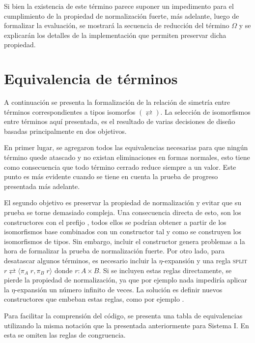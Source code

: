 Si bien la existencia de este término parece suponer un impedimento para el cumplimiento de la propiedad de normalización fuerte, más adelante, luego de formalizar la evaluación, se mostrará la secuencia de reducción del término $\Omega$ y se explicarán los detalles de la implementación que permiten preservar dicha propiedad.

\section{Equivalencia de términos}

A continuación se presenta la formalización de la relación de simetría entre términos correspondientes a tipos isomorfos $(\rightleftarrows)$.
La selección de isomorfismos entre términos aquí presentada, es el resultado de varias decisiones de diseño basadas principalmente en dos objetivos.

En primer lugar, se agregaron todos las equivalencias necesarias para que ningún término quede atascado y no existan eliminaciones en formas normales, esto tiene como consecuencia que todo término cerrado reduce siempre a un valor.
Este punto es más evidente cuando se tiene en cuenta la prueba de progreso presentada más adelante.

El segundo objetivo es preservar la propiedad de normalización y evitar que su prueba se torne demasiado compleja.
Una consecuencia directa de esto, son los constructores con el prefijo , todos ellos se podrían obtener a partir de los isomorfismos base combinados con un constructor  tal y como se construyen los isomorfismos de tipos.
Sin embargo, incluir el constructor  genera problemas a la hora de formalizar la prueba de normalización fuerte.
Por otro lado, para desatascar algunos términos, es necesario incluir la $\eta$-expansión y una regla \textsc{split} $r \rightleftarrows \langle \pi_A\; r , \pi_B\; r \rangle$ donde $r: A \times B$.
Si se incluyen estas reglas directamente, se pierde la propiedad de normalización, ya que por ejemplo nada impediría aplicar la $\eta$-expansión un número infinito de veces.
La solución es definir nuevos constructores que embeban estas reglas, como por ejemplo .

Para facilitar la comprensión del código, se presenta una tabla de equivalencias utilizando la misma notación que la presentada anteriormente para Sistema I.
En esta se omiten las reglas de congruencia.

